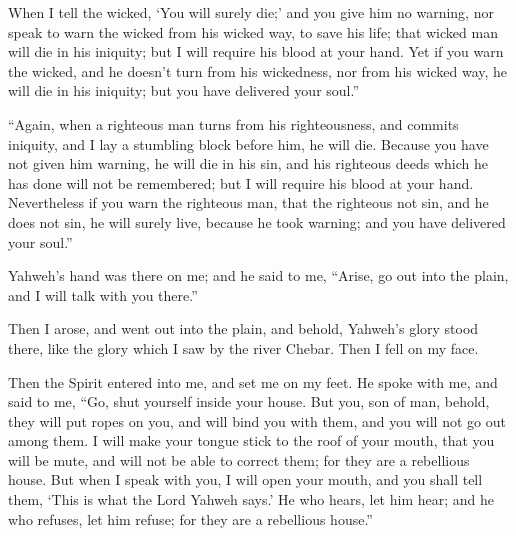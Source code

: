 {When I tell the wicked, ‘You will surely die;’ and you give him no warning, nor speak to warn the wicked from his wicked way, to save his life; that wicked man will die in his iniquity; but I will require his blood at your hand.
Yet if you warn the wicked, and he doesn’t turn from his wickedness, nor from his wicked way, he will die in his iniquity; but you have delivered your soul.”
\par }{\PP {}“Again, when a righteous man turns from his righteousness, and commits iniquity, and I lay a stumbling block before him, he will die. Because you have not given him warning, he will die in his sin, and his righteous deeds which he has done will not be remembered; but I will require his blood at your hand.
Nevertheless if you warn the righteous man, that the righteous not sin, and he does not sin, he will surely live, because he took warning; and you have delivered your soul.”
\par }{\PP {}Yahweh’s hand was there on me; and he said to me, “Arise, go out into the plain, and I will talk with you there.”
\par }{\PP {}Then I arose, and went out into the plain, and behold, Yahweh’s glory stood there, like the glory which I saw by the river Chebar. Then I fell on my face.
\par }{\PP {}Then the Spirit entered into me, and set me on my feet. He spoke with me, and said to me, “Go, shut yourself inside your house.
But you, son of man, behold, they will put ropes on you, and will bind you with them, and you will not go out among them.
I will make your tongue stick to the roof of your mouth, that you will be mute, and will not be able to correct them; for they are a rebellious house.
But when I speak with you, I will open your mouth, and you shall tell them, ‘This is what the Lord Yahweh says.’ He who hears, let him hear; and he who refuses, let him refuse; for they are a rebellious house.”

}
